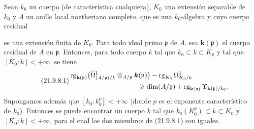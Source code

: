 \begin{proposition}[21.9.8]
\label{0.21.9.8-fr}
Sean $k_0$ un cuerpo (de característica cualquiera), $K_0$ una extensión
separable de $k_0$ y $A$ un anillo local noetheriano completo, que es una
$k_0$-álgebra y cuyo cuerpo residual

es una extensión finita de $K_0$. Para todo ideal primo $\mathfrak p$ de $A$,
sea $\boldsymbol{k}(\mathfrak p)$ el cuerpo residual de $A$ en $\mathfrak p$. Entonces,
para todo cuerpo $k$ tal que $k_0\subset k\subset K_0$ y tal que
$[K_0:k]<+\infty$, se tiene
\begin{equation}
\tag{21.9.8.1}
\label{0.21.9.8.1-fr}
\begin{split}
  &\operatorname{rg}_{\mathbf{k}(\mathfrak p)}
    \bigl(\widehat\Omega^1_{(A/\mathfrak p)/k}
      \otimes_{A/\mathfrak p}\boldsymbol{k}(\mathfrak p)\bigr)
    -\operatorname{rg}_{K_0}\Omega^1_{K_0/k}\\
  &\hspace{35mm}\geqslant
    \dim(A/\mathfrak p)
    +\operatorname{rg}_{\mathbf{k}(\mathfrak p)}\Upsilon_{\mathbf{k}(\mathfrak p)/k_0}.
\end{split}
\end{equation}
Supongamos además que $[k_0:k_0^p]<+\infty$ (donde $p$ es el exponente
característico de $k_0$). Entonces se puede encontrar un cuerpo $k$ tal que
$k_0(K_0^p)\subset k\subset K_0$ y $[K_0:k]<+\infty$, para el cual los dos
miembros de \textup{(21.9.8.1)} son iguales.
\end{proposition}

